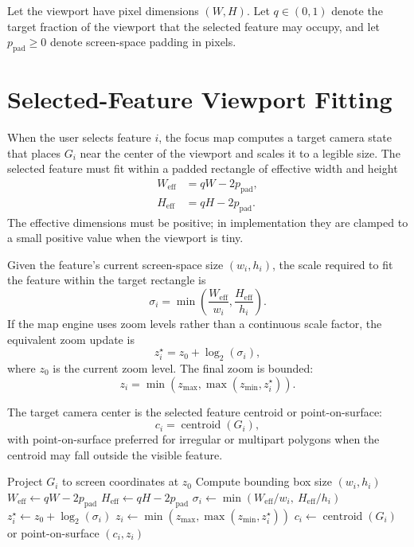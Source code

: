 \documentclass[12pt, a4paper]{article}
\numberwithin{equation}{section}
\newcommand{\centroid}{\operatorname{centroid}}
\begin{document}
Let the viewport have pixel dimensions $(W,H)$. Let $q \in (0,1)$ denote the target fraction of the viewport that the selected feature may occupy, and let $p_{\mathrm{pad}} \geq 0$ denote screen-space padding in pixels.

\section{Selected-Feature Viewport Fitting}

When the user selects feature $i$, the focus map computes a target camera state that places $G_i$ near the center of the viewport and scales it to a legible size. The selected feature must fit within a padded rectangle of effective width and height
\begin{align}
  W_{\mathrm{eff}} &= qW - 2p_{\mathrm{pad}}, \\
  H_{\mathrm{eff}} &= qH - 2p_{\mathrm{pad}}.
\end{align}
The effective dimensions must be positive; in implementation they are clamped to a small positive value when the viewport is tiny.

Given the feature's current screen-space size $(w_i,h_i)$, the scale required to fit the feature within the target rectangle is
\begin{equation}
  \sigma_i =
  \min\left(
    \frac{W_{\mathrm{eff}}}{w_i},
    \frac{H_{\mathrm{eff}}}{h_i}
  \right).
  \label{eq:fit-scale}
\end{equation}
If the map engine uses zoom levels rather than a continuous scale factor, the equivalent zoom update is
\begin{equation}
  z_i^\star = z_0 + \log_2(\sigma_i),
  \label{eq:zoom-update}
\end{equation}
where $z_0$ is the current zoom level. The final zoom is bounded:
\begin{equation}
  z_i = \min(z_{\max}, \max(z_{\min}, z_i^\star)).
  \label{eq:bounded-zoom}
\end{equation}

The target camera center is the selected feature centroid or point-on-surface:
\begin{equation}
  c_i = \centroid(G_i),
\end{equation}
with point-on-surface preferred for irregular or multipart polygons when the centroid may fall outside the visible feature.

\begin{algorithm}[H]
\caption{Selected-feature focus transform}
Project $G_i$ to screen coordinates at $z_0$\;
Compute bounding box size $(w_i,h_i)$\;
$W_{\mathrm{eff}} \leftarrow qW - 2p_{\mathrm{pad}}$\;
$H_{\mathrm{eff}} \leftarrow qH - 2p_{\mathrm{pad}}$\;
$\sigma_i \leftarrow \min(W_{\mathrm{eff}}/w_i,\ H_{\mathrm{eff}}/h_i)$\;
$z_i^\star \leftarrow z_0 + \log_2(\sigma_i)$\;
$z_i \leftarrow \min(z_{\max}, \max(z_{\min}, z_i^\star))$\;
$c_i \leftarrow \centroid(G_i)$ or point-on-surface\;
\Return $(c_i,z_i)$\;
\end{algorithm}
\end{document}
